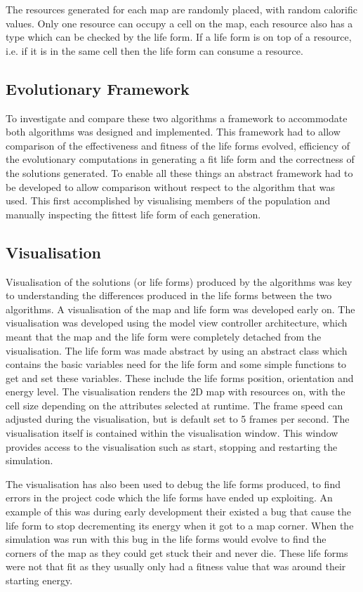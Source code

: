 \documentclass[12pt]{article}
\begin{document}
The resources generated for each map are randomly placed, with random calorific values. Only one resource can occupy a cell on the map, each resource also has
a type which can be checked by the life form. If a life form is on top of a resource, i.e. if it is in the same cell then the life form can consume a resource. 
 

\subsection{Evolutionary Framework}
To investigate and compare these two algorithms a framework to accommodate both algorithms was designed and implemented. This framework had to allow comparison
of the effectiveness and fitness of the life forms evolved, efficiency of the 
evolutionary computations in generating a fit life form and the correctness of the solutions generated. To enable all these things an abstract framework had 
to be developed to allow comparison without respect to the algorithm that was used. This first accomplished by visualising members of the population and 
manually inspecting the fittest life form of each generation. 


\subsection{Visualisation}
Visualisation of the solutions (or life forms) produced by the algorithms was key
to understanding the differences produced in the life forms between the two algorithms. A visualisation of the map and life form
was developed early on. The visualisation was developed using the model view controller architecture,
which meant that the map and the life form were completely detached from the visualisation.
The life form was made abstract by using an abstract class which contains the basic variables need for the life
form and some simple functions to get and set these variables. These include the life forms position, orientation
and energy level. The visualisation renders the 2D map with resources on, with the cell size depending on the attributes selected at runtime. The frame speed can
adjusted during the visualisation, but is default set to 5 frames per second. The visualisation itself is contained within the visualisation window. This window
provides access to the visualisation such as start, stopping and restarting the simulation.

The visualisation has also been used to debug the life forms produced, to find errors in the project code which the life forms have ended up exploiting. An example
of this was during early development their existed a bug that cause the life form to stop decrementing its energy when it got to a map corner. When the simulation
was run with this bug in the life forms would evolve to find the corners of the map as they could get stuck their and never die. These life forms were not that fit 
as they usually only had a fitness value that was around their starting energy.
\end{document}
